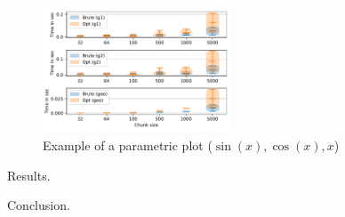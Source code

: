 \begin{figure}[h]
\centering
\includegraphics[width=0.5\textwidth]{data/raw/pathways.pdf}
\caption{Example of a parametric plot ($\sin (x), \cos(x), x$)}
\end{figure}


Results.

Conclusion. 